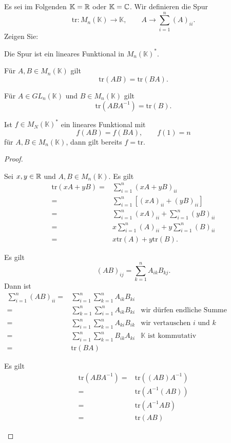 \begin{Problem}
	Es sei im Folgenden $\mathbb{K}=\mathbb{R}$ oder $\mathbb{K}=\mathbb{C}$. Wir definieren die Spur
	\[
		\text{tr}:M_n(\mathbb{K})\to \mathbb{K}, \qquad A \to \sum_{i=1}^n (A)_{ii}
	.\] 
	Zeigen Sie:
	\begin{parts}
	\item Die Spur ist ein lineares Funktional in $M_n(\mathbb{K})^*$.
	\item F\"{u}r $A,B\in M_n(\mathbb{K})$ gilt
		\[ 
			\text{tr}(AB)=\text{tr}(BA)
		.\] 
	\item F\"{u}r $A\in GL_n(\mathbb{K})$ und $B\in M_n(\mathbb{K})$ gilt
		\[
			\text{tr}(ABA^{-1})=\text{tr}(B)
		.\] 
	\item Ist $f\in M_N(\mathbb{K})^*$ ein lineares Funktional mit
		\[
		f(AB)=f(BA),\qquad f(1)=n\] 
		f\"{u}r $A,B\in M_n(\mathbb{K})$, dann gilt bereits $f=\text{tr}$.
	\end{parts}
\end{Problem}
\begin{proof}
	\begin{parts}
	\item Sei $x,y\in \mathbb{R}$ und $A,B\in M_n(\mathbb{K})$. Es gilt
		\begin{align*}
			\text{tr}(xA+yB)=&\sum_{i=1}^n\left( xA+yB \right)_{ii}\\
			=& \sum_{i=1}^n \left[ (xA)_{ii}+(yB)_{ii} \right] \\
			=&\sum_{i=1}^n \left( xA \right)_{ii}+\sum_{i=1}^n \left( yB \right)_{ii}\\
			=& x\sum_{i=1}^n (A)_{ii}+y\sum_{i=1}^n (B)_{ii}\\
			=&x\text{tr}(A)+y\text{tr}(B).
		\end{align*}
	\item Es gilt
		\[
			(AB)_{ij}=\sum_{k=1}^n A_{ik}B_{kj}
		.\] 
		Dann ist
		\begin{align*}
			\sum_{i=1}^n (AB)_{ii}=&\sum_{i=1}^n\sum_{k=1}^n A_{ik}B_{ki}\\
			=&\sum_{k=1}^n\sum_{i=1}^n A_{ik}B_{ki} & \text{wir dürfen endliche Summe umordnen}\\
			=&\sum_{i=1}^n\sum_{k=1}^n A_{ki}B_{ik} & \text{wir vertauschen }i\text{ und }k\\
			=&\sum_{i=1}^n\sum_{k=1}^n B_{ik}A_{ki} & \mathbb{K}\text{ ist kommutativ}\\
			=&\text{tr}(BA)
		\end{align*}
	\item Es gilt
		\begin{align*}
			\text{tr}(ABA^{-1})=&\text{tr}\left( (AB)A^{-1} \right) \\
			=&\text{tr}\left( A^{-1}(AB) \right) \\
			=& \text{tr}(A^{-1}AB)\\
			=&\text{tr}(AB)
		\end{align*}
	\end{parts}
\end{proof}
